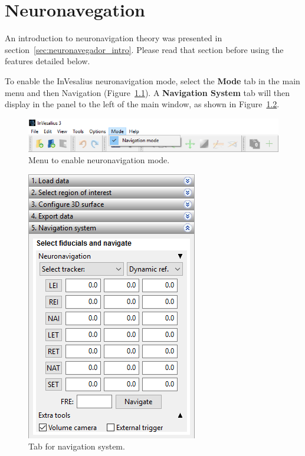 \chapter{Neuronavegation}
\label{sec:neuronavegador}

An introduction to neuronavigation theory was presented in section~\ref{sec:neuronavegador_intro}. Please read that section before using the features detailed below.

To enable the InVesalius neuronavigation mode, select the \textbf{Mode} tab in the main menu and then Navigation (Figure~\ref{fig:nav_menu_en}). A \textbf{Navigation System} tab will then display in the panel to the left of the main window, as shown in Figure~\ref{fig:nav_painel_en}.

\begin{figure}[!htb]
\centering
\includegraphics[scale=0.4]{../user_guide_figures/invesalius_screen/nav_menu_en.png}
\caption{Menu to enable neuronavigation mode.}
\label{fig:nav_menu_en}
\end{figure}

\begin{figure}[!htb]
\centering
\includegraphics[scale=0.6]{../user_guide_figures/invesalius_screen/nav_painel_en.png}
\caption{Tab for navigation system.}
\label{fig:nav_painel_en}
\end{figure}

